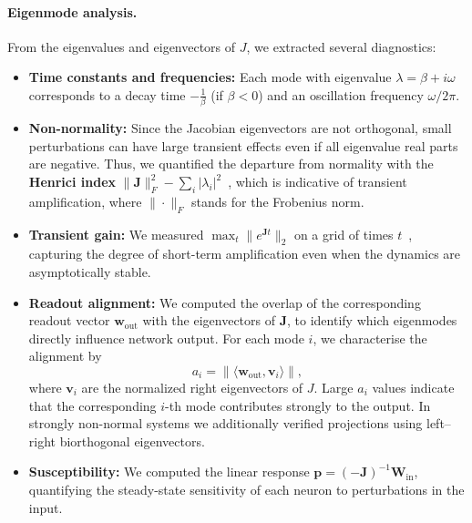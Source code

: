 \documentclass[mlabstract]{jmlr}
\begin{document}
\paragraph{Eigenmode analysis.}
From the eigenvalues and eigenvectors of $J$, 
we extracted several diagnostics:
\begin{itemize}
    \item \textbf{Time constants and frequencies:} 
    Each mode with eigenvalue $\lambda = \beta + i\omega$ corresponds 
    to a decay time $-\tfrac{1}{\beta}$ (if $\beta < 0$) and an oscillation frequency $\omega / 2\pi$.
    \item \textbf{Non-normality:} Since the Jacobian eigenvectors are not orthogonal, small perturbations can have large transient effects even if all eigenvalue real parts are negative.
    Thus, we quantified the departure from normality with the \textbf{Henrici index}
    $\|\mathbf{J}\|^2_F - \sum_i |\lambda_i|^2$~\citep{murphy2009balanced,asllani2018structure}, which is indicative of transient amplification, where $\|\cdot\|_F$ stands for the Frobenius norm.
    \item \textbf{Transient gain:} We measured $\max_t \|e^{\mathbf{J} t}\|_2$ 
    on a grid of times $t$~\citep{christodoulou2022regimes, asllani2018topological}, capturing the degree of short-term amplification even when the dynamics are asymptotically stable.
    \item \textbf{Readout alignment:} 
    We computed the overlap of the corresponding readout vector $\mathbf{w}_{\text{out}}$ 
    with the eigenvectors of $\mathbf{J}$, to identify which eigenmodes directly influence network output.
    For each mode $i$, we characterise the alignment by
\begin{equation}
a_i = \bigl\|\langle \textbf{w}_{\text{out}}, \textbf{v}_i \rangle \bigr\|,
\end{equation}
where $\mathbf{v}_i$ are the normalized right eigenvectors of $J$. 
Large $a_i$ values indicate that the corresponding $i$-th mode contributes strongly to the output. 
In strongly non-normal systems we additionally verified projections using left--right biorthogonal eigenvectors.

    \item \textbf{Susceptibility:} We computed the linear response 
    $\mathbf{p} = (-\mathbf{J})^{-1} \mathbf{W}_{\text{in}}$,
    quantifying the steady-state sensitivity of each neuron to perturbations in the input.
\end{itemize}
\end{document}
